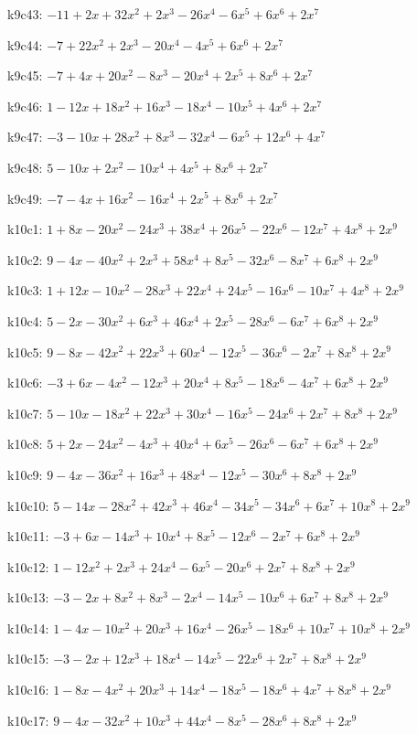 k9c43: $ -11+2x+32x^{2}+2x^{3}-26x^{4}-6x^{5}+6x^{6}+2x^{7} $ 

k9c44: $ -7+22x^{2}+2x^{3}-20x^{4}-4x^{5}+6x^{6}+2x^{7} $ 

k9c45: $ -7+4x+20x^{2}-8x^{3}-20x^{4}+2x^{5}+8x^{6}+2x^{7} $ 

k9c46: $ 1-12x+18x^{2}+16x^{3}-18x^{4}-10x^{5}+4x^{6}+2x^{7} $ 

k9c47: $ -3-10x+28x^{2}+8x^{3}-32x^{4}-6x^{5}+12x^{6}+4x^{7} $ 

k9c48: $ 5-10x+2x^{2}-10x^{4}+4x^{5}+8x^{6}+2x^{7} $ 

k9c49: $ -7-4x+16x^{2}-16x^{4}+2x^{5}+8x^{6}+2x^{7} $ 

k10c1: $ 1+8x-20x^{2}-24x^{3}+38x^{4}+26x^{5}-22x^{6}-12x^{7}+4x^{8}+2x^{9} $ 

k10c2: $ 9-4x-40x^{2}+2x^{3}+58x^{4}+8x^{5}-32x^{6}-8x^{7}+6x^{8}+2x^{9} $ 

k10c3: $ 1+12x-10x^{2}-28x^{3}+22x^{4}+24x^{5}-16x^{6}-10x^{7}+4x^{8}+2x^{9} $ 

k10c4: $ 5-2x-30x^{2}+6x^{3}+46x^{4}+2x^{5}-28x^{6}-6x^{7}+6x^{8}+2x^{9} $ 

k10c5: $ 9-8x-42x^{2}+22x^{3}+60x^{4}-12x^{5}-36x^{6}-2x^{7}+8x^{8}+2x^{9} $ 

k10c6: $ -3+6x-4x^{2}-12x^{3}+20x^{4}+8x^{5}-18x^{6}-4x^{7}+6x^{8}+2x^{9} $ 

k10c7: $ 5-10x-18x^{2}+22x^{3}+30x^{4}-16x^{5}-24x^{6}+2x^{7}+8x^{8}+2x^{9} $ 

k10c8: $ 5+2x-24x^{2}-4x^{3}+40x^{4}+6x^{5}-26x^{6}-6x^{7}+6x^{8}+2x^{9} $ 

k10c9: $ 9-4x-36x^{2}+16x^{3}+48x^{4}-12x^{5}-30x^{6}+8x^{8}+2x^{9} $ 

k10c10: $ 5-14x-28x^{2}+42x^{3}+46x^{4}-34x^{5}-34x^{6}+6x^{7}+10x^{8}+2x^{9} $ 

k10c11: $ -3+6x-14x^{3}+10x^{4}+8x^{5}-12x^{6}-2x^{7}+6x^{8}+2x^{9} $ 

k10c12: $ 1-12x^{2}+2x^{3}+24x^{4}-6x^{5}-20x^{6}+2x^{7}+8x^{8}+2x^{9} $ 

k10c13: $ -3-2x+8x^{2}+8x^{3}-2x^{4}-14x^{5}-10x^{6}+6x^{7}+8x^{8}+2x^{9} $ 

k10c14: $ 1-4x-10x^{2}+20x^{3}+16x^{4}-26x^{5}-18x^{6}+10x^{7}+10x^{8}+2x^{9} $ 

k10c15: $ -3-2x+12x^{3}+18x^{4}-14x^{5}-22x^{6}+2x^{7}+8x^{8}+2x^{9} $ 

k10c16: $ 1-8x-4x^{2}+20x^{3}+14x^{4}-18x^{5}-18x^{6}+4x^{7}+8x^{8}+2x^{9} $ 

k10c17: $ 9-4x-32x^{2}+10x^{3}+44x^{4}-8x^{5}-28x^{6}+8x^{8}+2x^{9} $ 


